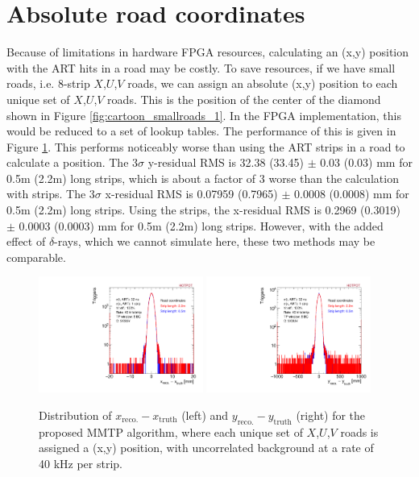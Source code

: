 \section{Absolute road coordinates}
\label{sec:roadcoord}

Because of limitations in hardware FPGA resources, calculating an (x,y) position with the ART hits in a road may be costly. To save resources, if we have small roads, i.e. 8-strip $X$,$U$,$V$ roads, we can assign an absolute (x,y) position to each unique set of $X$,$U$,$V$ roads. This is the position of the center of the diamond shown in Figure \ref{fig:cartoon_smallroads_1}. In the FPGA implementation, this would be reduced to a set of lookup tables. The performance of this is given in Figure \ref{fig:resolutions_cen}. This performs noticeably worse than using the ART strips in a road to calculate a position. The 3$\sigma$ y-residual RMS is 32.38 (33.45) $\pm$ 0.03 (0.03) mm for 0.5m (2.2m) long strips, which is about a factor of 3 worse than the calculation with strips. The 3$\sigma$ x-residual RMS is 0.07959 (0.7965) $\pm$ 0.0008 (0.0008) mm for 0.5m (2.2m) long strips. Using the strips, the x-residual RMS is 0.2969 (0.3019) $\pm$ 0.0003 (0.0003) mm for 0.5m (2.2m) long strips. However, with the added effect of $\delta$-rays, which we cannot simulate here, these two methods may be comparable.  

\begin{figure}[!htpb]
  \begin{center}
    \includegraphics[width=0.48\textwidth]{figures/xres_cen.pdf}
    \includegraphics[width=0.48\textwidth]{figures/yres_cen.pdf}
  \end{center}
  \vspace{-10pt}
  \caption{Distribution of $x_\text{reco.} - x_\text{truth}$ (left) and $y_\text{reco.} - y_\text{truth}$ (right) for the proposed MMTP algorithm, where each unique set of $X$,$U$,$V$ roads is assigned a (x,y) position, with uncorrelated background at a rate of 40 kHz per strip.}
  \label{fig:resolutions_cen}
\end{figure}
